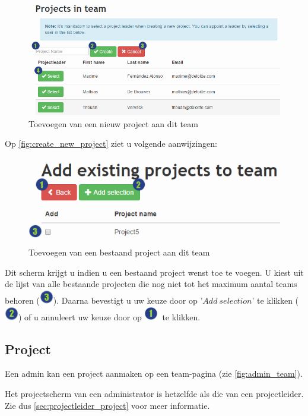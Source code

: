 \documentclass[a4paper,11pt]{article}
\newcommand{\one}{\includegraphics[scale=0.5]{Gebruikershandleiding_img/1.png}}
\newcommand{\two}{\includegraphics[scale=0.5]{Gebruikershandleiding_img/2.png}}
\newcommand{\three}{\includegraphics[scale=0.5]{Gebruikershandleiding_img/3.png}}
\newcommand*{\myitem}{
 \item[{\texttt{[image: GebruikersHandleiding\_img/\\intcalcMod\{\\value\{enumi]}+1}{15}.png}}]\stepcounter{enumi}
\begin{document}
\begin{figure}[H]
\centering
\includegraphics[scale=0.5]{Gebruikershandleiding_img/create_new_project.png}
\caption{Toevoegen van een nieuw project aan dit team}
\label{fig:create_new_project}
\end{figure}

Op \autoref{fig:create_new_project} ziet u volgende aanwijzingen:


\begin{figure}[H]
\centering
\includegraphics[scale=0.5]{Gebruikershandleiding_img/create_existing_project.png}
\caption{Toevoegen van een bestaand project aan dit team}
\label{fig:create_existing_project}
\end{figure}

Dit scherm krijgt u indien u een bestaand project wenst toe te voegen. U kiest uit de lijst van alle bestaande projecten die nog niet tot het maximum aantal teams behoren (\three). Daarna bevestigt u uw keuze door op '$Add\ selection$' te klikken (\two) of u annuleert uw keuze door op \one\ te klikken.

\subsection{Project}
\label{sec:admin_project}
Een admin kan een project aanmaken op een team-pagina (zie \autoref{fig:admin_team}).

Het projectscherm van een administrator is hetzelfde als die van een projectleider. Zie dus  \autoref{sec:projectleider_project} voor meer informatie.
\end{document}
